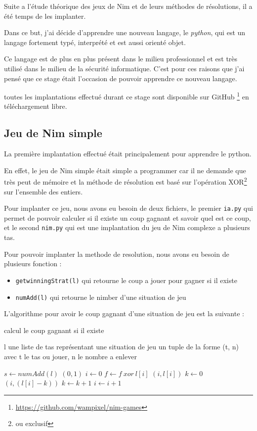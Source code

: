 Suite a l’étude théorique des jeux de Nim et de leurs méthodes de résolutions, il a été temps de les implanter.

Dans ce but, j'ai décide d'apprendre une nouveau langage, le \textit{python}, qui est un langage fortement typé, interprété et est aussi orienté objet. 

Ce langage est de plus en plus présent dans le milieu professionnel et est très utilisé dans le milieu de la sécurité informatique. C'est pour ces raisons que j'ai pensé que ce stage était l'occasion de pouvoir apprendre ce nouveau langage.

toutes les implantations effectué durant ce stage sont disponible sur GitHub \footnote{\url{https://github.com/wampixel/nim-games}} en téléchargement libre.
\subsection{Jeu de Nim simple}
\label{sub:Jeu de Nim simple}

La première implantation effectué était principalement pour apprendre le python.

En effet, le jeu de Nim simple était simple a programmer car il ne demande que très peut de mémoire et la méthode de résolution est basé sur l’opération XOR\footnote{ou exclusif} sur l'ensemble des entiers.

Pour implanter ce jeu, nous avons eu besoin de deux fichiers, le premier \texttt{ia.py} qui permet de pouvoir calculer si il existe un coup gagnant et savoir quel est ce coup, et le second \texttt{nim.py} qui est une implantation du jeu de Nim complexe a plusieurs tas.

Pour pouvoir implanter la methode de resolution, nous avons eu besoin de plusieurs fonction :
\begin{itemize}
  \item \texttt{getwinningStrat(l)} qui retourne le coup a jouer pour gagner si il existe
  \item \texttt{numAdd(l)} qui retourne le nimber d'une situation de jeu 
\end{itemize}

L'algorithme pour avoir le coup gagnant d'une situation de jeu est la suivante :
\begin{algorithm}[hbt]
  \caption{calcul le coup gagnant si il existe}
  \begin{algorithmic}
    \REQUIRE l une liste de tas représentant une situation de jeu
    \ENSURE un tuple de la forme (t, n) avec t le tas ou jouer, n le nombre a enlever
    
    \STATE $s \leftarrow numAdd(l)$
      \RETURN $(0, 1)$
    \ELSE
      \STATE $i \leftarrow 0$
        \STATE $f \leftarrow f\ xor\ l[i]$
          \RETURN $(i, l[i])$
        \ELSE
          \STATE $k \leftarrow 0$
              \RETURN $(i, (l[i] - k))$
            \ELSE
              \STATE $k \leftarrow k + 1$
            \ENDIF
          \ENDWHILE
        \ENDIF
        \STATE $i \leftarrow i + 1$
      \ENDWHILE
    \ENDIF
  \end{algorithmic}
\end{algorithm}    

